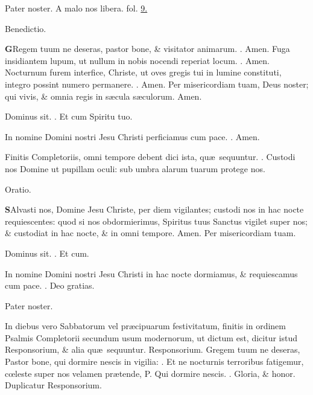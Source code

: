 \documentclass[letter,11pt]{book}
\makeatletter
\DeclareRobustCommand{\Vbar}{\vers@resp{-0.1em}{V}}
\DeclareRobustCommand{\Rbar}{\vers@resp{0pt}{R}}
\newcommand{\vers@resp@sym}{\raisebox{0.2ex}{\rotatebox[origin=c]{-20}{$\m@th\rceil$}}}
\newcommand{\vers@resp}[2]{%
  {\ooalign{\hidewidth\kern#1\vers@resp@sym\hidewidth\cr#2\cr}}%
}%
\def\P{\color{Red} P. \color{black}}
\def\V{\color{Red} \Vbar . \color{black}}
\def\R{\color{Red} \Rbar . \color{black}}
\makeatother
\begin{document}
\begin{multicols*}{2}
\par Pater noster.
\newline A malo nos libera. \color{Red} fol. \color{black} \hyperlink{page.9}{9.}
\vspace{-.5em} \begin{center} \color{Red} Benedictio. \end{center} \vspace{-.5em}
\lettrine[lines=2]{\bfseries \color{Red} G}{}Regem tuum ne deseras, pastor bone, \& visitator animarum. \R Amen. Fuga insidiantem lupum, ut nullum in nobis nocendi reperiat locum. \R Amen. Nocturnum furem interfice, Christe, ut oves gregis tui in lumine constituti, integro possint numero permanere. \R Amen. Per misericordiam tuam, Deus noster; qui vivis, \& omnia regis in s\ae cula s\ae culorum. Amen. %
\par Dominus sit. \R Et cum Spiritu tuo.
\par In nomine Domini nostri Jesu Christi perficiamus cum pace. \R Amen.
\par \color{Red} Finitis Completoriis, omni tempore debent dici ista, qu\ae \ sequuntur. \color{black}
\newline \V Custodi nos Domine ut pupillam oculi: sub umbra alarum tuarum protege nos.
\vspace{-.5em} \begin{center} \color{Red} Oratio. \end{center} \vspace{-.5em}
\lettrine[lines=2]{\bfseries \color{Red} S}{}Alvasti nos, Domine Jesu Christe, per diem vigilantes; custodi nos in hac nocte requiescentes: quod si nos obdormierimus, Spiritus tuus Sanctus vigilet super nos; \& custodiat in hac nocte, \& in omni tempore. Amen. Per misericordiam tuam.
\par Dominus sit. \R Et cum.
\par In nomine Domini nostri Jesu Christi in hac nocte dormiamus, \& requiescamus cum pace. \R Deo gratias.
\par Pater noster.
\par \color{Red} In diebus vero Sabbatorum vel pr\ae cipuarum festivitatum, finitis in ordinem Psalmis Completorii secundum usum modernorum, ut dictum est, dicitur istud Responsorium, \& alia qu\ae \ sequuntur. \color{black}
\newline \color{Red} Responsorium. \color{black} Gregem tuum ne deseras, Pastor bone, qui dormire nescis in vigilia: \V Et ne nocturnis terroribus fatigemur, c\oe leste super nos velamen pr\ae tende, \P Qui dormire nescis. \V Gloria, \& honor. \color{Red} Duplicatur Responsorium. \color{black}

\end{multicols*}
\end{document}
